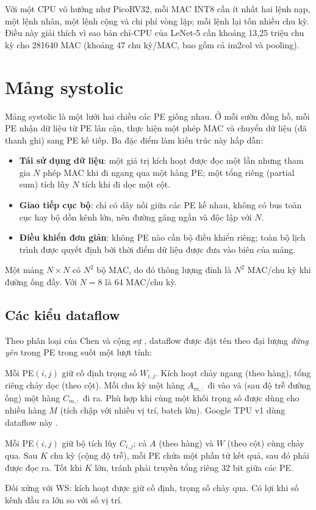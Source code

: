 Với một CPU vô hướng như PicoRV32, mỗi MAC INT8 cần ít nhất hai lệnh nạp, một lệnh nhân, một lệnh cộng và chi phí vòng lặp; mỗi lệnh lại tốn nhiều chu kỳ. Điều này giải thích vì sao bản chỉ-CPU của LeNet-5 cần khoảng 13,25 triệu chu kỳ cho \num{281640} MAC (khoảng 47 chu kỳ/MAC, bao gồm cả im2col và pooling).

\section{Mảng systolic}
\label{sec:systolic}
Mảng systolic \cite{kung1982} là một lưới hai chiều các PE giống nhau. Ở mỗi sườn đồng hồ, mỗi PE nhận dữ liệu từ PE lân cận, thực hiện một phép MAC và chuyển dữ liệu (đã thanh ghi) sang PE kế tiếp. Ba đặc điểm làm kiến trúc này hấp dẫn:
\begin{itemize}
  \item \textbf{Tái sử dụng dữ liệu}: một giá trị kích hoạt được đọc một lần nhưng tham gia $N$ phép MAC khi đi ngang qua một hàng PE; một tổng riêng (partial sum) tích lũy $N$ tích khi đi dọc một cột.
  \item \textbf{Giao tiếp cục bộ}: chỉ có dây nối giữa các PE kề nhau, không có bus toàn cục hay bộ dồn kênh lớn, nên đường găng ngắn và độc lập với $N$.
  \item \textbf{Điều khiển đơn giản}: không PE nào cần bộ điều khiển riêng; toàn bộ lịch trình được quyết định bởi thời điểm dữ liệu được đưa vào biên của mảng.
\end{itemize}
Một mảng $N\times N$ có $N^2$ bộ MAC, do đó thông lượng đỉnh là $N^2$ MAC/chu kỳ khi đường ống đầy. Với $N=8$ là 64 MAC/chu kỳ.

\subsection{Các kiểu dataflow}
Theo phân loại của Chen và cộng sự \cite{chen2016eyeriss,sze2017survey}, dataflow được đặt tên theo đại lượng \emph{đứng yên} trong PE trong suốt một lượt tính:
\begin{description}[style=nextline]
  \item[Weight-stationary (WS)] Mỗi PE$(i,j)$ giữ cố định trọng số $W_{i,j}$. Kích hoạt chảy ngang (theo hàng), tổng riêng chảy dọc (theo cột). Mỗi chu kỳ một hàng $A_{m,:}$ đi vào và (sau độ trễ đường ống) một hàng $C_{m,:}$ đi ra. Phù hợp khi cùng một khối trọng số được dùng cho nhiều hàng $M$ (tích chập với nhiều vị trí, batch lớn). Google TPU v1 dùng dataflow này \cite{jouppi2017tpu}.
  \item[Output-stationary (OS)] Mỗi PE$(i,j)$ giữ bộ tích lũy $C_{i,j}$; cả $A$ (theo hàng) và $W$ (theo cột) cùng chảy qua. Sau $K$ chu kỳ (cộng độ trễ), mỗi PE chứa một phần tử kết quả, sau đó phải được đọc ra. Tốt khi $K$ lớn, tránh phải truyền tổng riêng 32 bit giữa các PE.
  \item[Input-stationary (IS)] Đối xứng với WS: kích hoạt được giữ cố định, trọng số chảy qua. Có lợi khi số kênh đầu ra lớn so với số vị trí.
\end{description}

